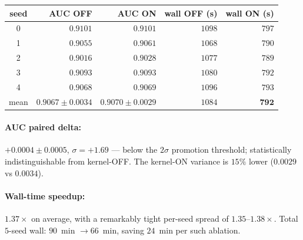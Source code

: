 \documentclass[11pt,a4paper]{article}
\begin{document}
\begin{center}\small
\begin{tabular}{c r r r r}
\toprule
\textbf{seed} & \textbf{AUC OFF} & \textbf{AUC ON} & \textbf{wall OFF (s)} & \textbf{wall ON (s)} \\
\midrule
0 & $0.9101$ & $0.9101$ & $1098$ & $797$ \\
1 & $0.9055$ & $0.9061$ & $1068$ & $790$ \\
2 & $0.9016$ & $0.9028$ & $1077$ & $789$ \\
3 & $0.9093$ & $0.9093$ & $1080$ & $792$ \\
4 & $0.9068$ & $0.9069$ & $1096$ & $793$ \\
\midrule
mean & $0.9067 \pm 0.0034$ & $0.9070 \pm 0.0029$ & $1084$ & $\mathbf{792}$ \\
\bottomrule
\end{tabular}
\end{center}

\begin{center}
\end{center}

\paragraph{AUC paired delta:} $+0.0004 \pm 0.0005$, $\sigma = +1.69$
--- below the $2\sigma$ promotion threshold; statistically
indistinguishable from kernel-OFF. The kernel-ON variance is
$15\%$ lower ($0.0029$ vs $0.0034$).

\paragraph{Wall-time speedup:} $1.37\times$ on average, with a
remarkably tight per-seed spread of $1.35$--$1.38\times$. Total
$5$-seed wall: $90$~min $\to 66$~min, saving $24$~min per such
ablation.
\end{document}
